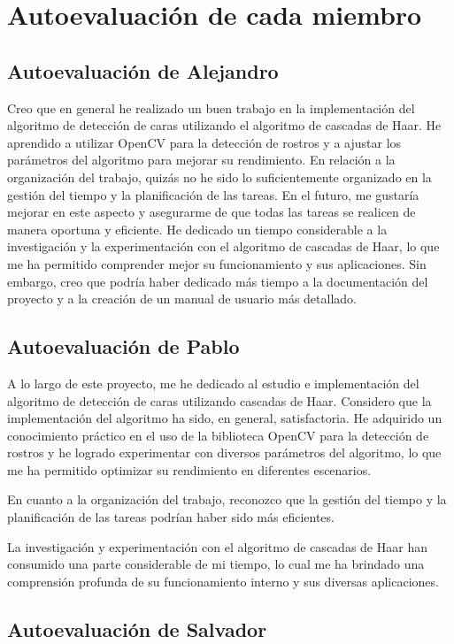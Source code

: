 \documentclass[a4paper]{article}
\begin{document}
\section{Autoevaluación de cada miembro}

\subsection{Autoevaluación de Alejandro}

Creo que en general he realizado un buen trabajo en la implementación del algoritmo de detección de caras utilizando el algoritmo de cascadas de Haar. He aprendido a utilizar OpenCV para la detección de rostros y a ajustar los parámetros del algoritmo para mejorar su rendimiento.
En relación a la organización del trabajo, quizás no he sido lo suficientemente organizado en la gestión del tiempo y la planificación de las tareas. En el futuro, me gustaría mejorar en este aspecto y asegurarme de que todas las tareas se realicen de manera oportuna y eficiente.
He dedicado un tiempo considerable a la investigación y la experimentación con el algoritmo de cascadas de Haar, lo que me ha permitido comprender mejor su funcionamiento y sus aplicaciones. Sin embargo, creo que podría haber dedicado más tiempo a la documentación del proyecto y a la creación de un manual de usuario más detallado.

\subsection{Autoevaluación de Pablo}

A lo largo de este proyecto, me he dedicado al estudio e implementación del algoritmo de detección de caras utilizando cascadas de Haar. Considero que la implementación del algoritmo ha sido, en general, satisfactoria. He adquirido un conocimiento práctico en el uso de la biblioteca OpenCV para la detección de rostros y he logrado experimentar con diversos parámetros del algoritmo, lo que me ha permitido optimizar su rendimiento en diferentes escenarios.

En cuanto a la organización del trabajo, reconozco que la gestión del tiempo y la planificación de las tareas podrían haber sido más eficientes. 

La investigación y experimentación con el algoritmo de cascadas de Haar han consumido una parte considerable de mi tiempo, lo cual me ha brindado una comprensión profunda de su funcionamiento interno y sus diversas aplicaciones. 
\subsection{Autoevaluación de Salvador}
\end{document}
